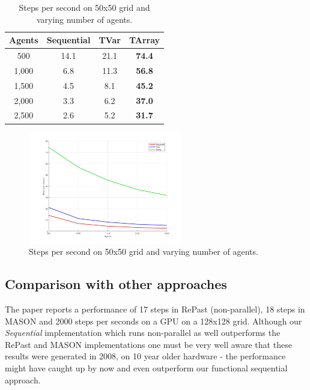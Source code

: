 \begin{table}
	\centering
  	\begin{tabular}{ c || c | c | c }
        Agents  & Sequential & TVar       & TArray        \\ \hline \hline 
    	500     & 14.1       & 21.1       & \textbf{74.4} \\ \hline
   		1,000   & 6.8        & 11.3       & \textbf{56.8} \\ \hline
   		1,500   & 4.5        & 8.1        & \textbf{45.2} \\ \hline
   		2,000   & 3.3        & 6.2        & \textbf{37.0} \\ \hline 
   		2,500   & 2.6        & 5.2        & \textbf{31.7}
   	\end{tabular}
  	
  	\caption{Steps per second on 50x50 grid and varying number of agents.}
	\label{tab:state_results_agentsscale_time}
\end{table}

\begin{figure}
	\centering
	\includegraphics[width=0.6\textwidth, angle=0]{./fig/sugarscape/agents_performance.png}
	\caption{Steps per second on 50x50 grid and varying number of agents.}
	\label{fig:state_results_agentsscale_time}
\end{figure}

\subsection{Comparison with other approaches}
The paper \cite{lysenko_framework_2008} reports a performance of 17 steps in RePast (non-parallel), 18 steps in MASON and 2000 steps per seconds on a GPU on a 128x128 grid. Although our \textit{Sequential} implementation which runs non-parallel as well outperforms the RePast and MASON implementations one must be very well aware that these results were generated in 2008, on 10 year older hardware - the performance might have caught up by now and even outperform our functional sequential approach. 

